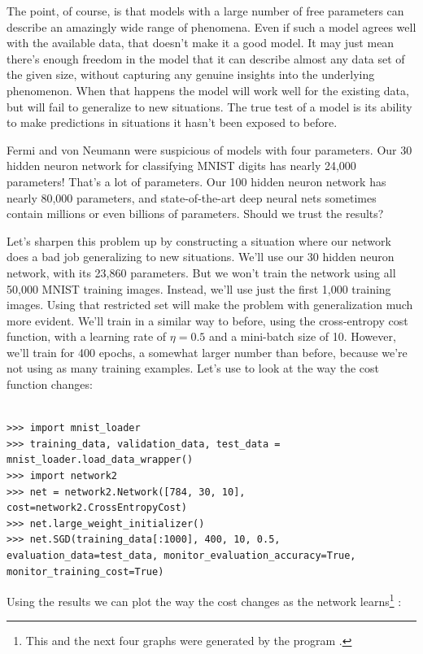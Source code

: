 \documentclass[a4paper,twoside,10pt]{book}
\begin{document}
The point, of course, is that models with a large number of free parameters can describe an amazingly wide range of phenomena. Even if such a model agrees well with the available data, that doesn't make it a good model. It may just mean there's enough freedom in the model that it can describe almost any data set of the given size, without capturing any genuine insights into the underlying phenomenon. When that happens the model will work well for the existing data, but will fail to generalize to new situations. The true test of a model is its ability to make predictions in situations it hasn't been exposed to before.

Fermi and von Neumann were suspicious of models with four parameters. Our 30 hidden neuron network for classifying MNIST digits has nearly 24,000 parameters! That's a lot of parameters. Our 100 hidden neuron network has nearly 80,000 parameters, and state-of-the-art deep neural nets sometimes contain millions or even billions of parameters. Should we trust the results?

Let's sharpen this problem up by constructing a situation where our network does a bad job generalizing to new situations. We'll use our 30 hidden neuron network, with its 23,860 parameters. But we won't train the network using all 50,000 MNIST training images. Instead, we'll use just the first 1,000 training images. Using that restricted set will make the problem with generalization much more evident. We'll train in a similar way to before, using the cross-entropy cost function, with a learning rate of $\eta=0.5$ and a mini-batch size of 10. However, we'll train for 400 epochs, a somewhat larger number than before, because we're not using as many training examples. Let's use  to look at the way the cost function changes:


\begin{lstlisting}

>>> import mnist_loader 
>>> training_data, validation_data, test_data = mnist_loader.load_data_wrapper()
>>> import network2 
>>> net = network2.Network([784, 30, 10], cost=network2.CrossEntropyCost) 
>>> net.large_weight_initializer()
>>> net.SGD(training_data[:1000], 400, 10, 0.5, evaluation_data=test_data, monitor_evaluation_accuracy=True, monitor_training_cost=True)
\end{lstlisting}
Using the results we can plot the way the cost changes as the network learns\footnote{This and the next four graphs were generated by the program .} :
\end{document}
